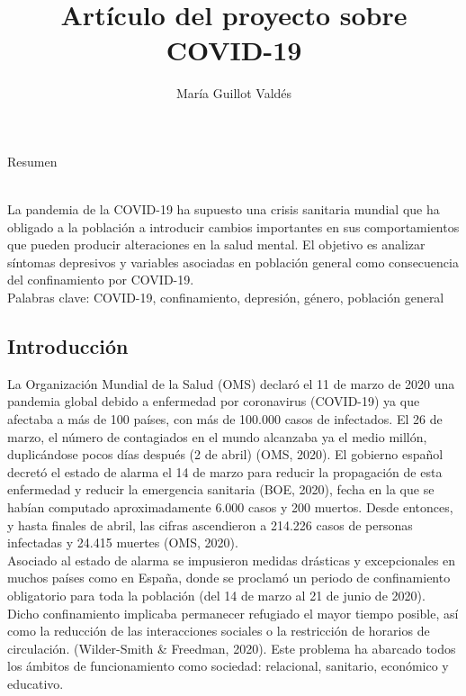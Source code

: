 \documentclass[a4paper,11pt]{article}
\begin{document}
\title{Artículo del proyecto sobre COVID-19}
\author{María Guillot Valdés}
\maketitle
\begin{center}
Resumen
\begin{center}
\begin{flushleft}
\\La pandemia de la COVID-19 ha supuesto una crisis sanitaria mundial que ha obligado a la población a introducir cambios importantes en sus comportamientos que pueden producir alteraciones en la salud mental. El objetivo es analizar síntomas depresivos y variables asociadas en población general como consecuencia del confinamiento por COVID-19.\\Palabras clave: COVID-19, confinamiento, depresión,  género, población general
\begin{flushleft}
\part{Introducción}
\begin{flushleft}
La Organización Mundial de la Salud (OMS) declaró el 11 de marzo de 2020 una pandemia global debido a enfermedad por coronavirus (COVID-19) ya que afectaba a más de 100 países, con más de 100.000 casos de infectados. El 26 de marzo, el número de contagiados en el mundo alcanzaba ya el medio millón, duplicándose pocos días después (2 de abril) (OMS, 2020). El gobierno español decretó el estado de alarma el 14 de marzo para reducir la propagación de esta enfermedad y reducir la emergencia sanitaria (BOE, 2020), fecha en la que se habían computado aproximadamente 6.000 casos y 200 muertos. Desde entonces, y hasta finales de abril, las cifras ascendieron a 214.226 casos de personas infectadas y 24.415 muertes (OMS, 2020). \\
Asociado al estado de alarma se impusieron medidas drásticas y excepcionales en muchos países como en España, donde se proclamó un periodo de confinamiento obligatorio para toda la población (del 14 de marzo al 21 de junio de 2020). Dicho confinamiento implicaba permanecer refugiado el mayor tiempo posible,  así como la reducción de las interacciones sociales o la restricción de horarios de circulación. (Wilder-Smith & Freedman, 2020). Este problema ha abarcado todos los ámbitos de funcionamiento como sociedad: relacional, sanitario, económico y  educativo. 

\end{flushleft}
\end{flushleft}
\end{flushleft}
\end{center}
\end{center}
\end{document}
